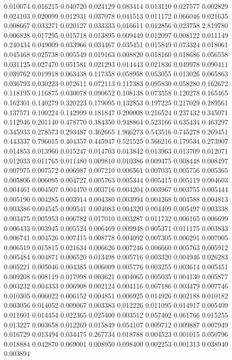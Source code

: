 0.010074
0.016215
0.040720
0.024129
0.083414
0.013110
0.027577
0.002829
0.024103
0.020099
0.012931
0.037078
0.041513
0.011172
0.066046
0.021635
0.008667
0.033271
0.020127
0.033333
0.016611
0.012856
0.023758
2.819780
0.006828
0.017295
0.015718
0.013895
0.009449
0.012097
0.008122
0.011149
0.240434
0.049009
0.033966
0.034467
0.035451
0.015849
0.073324
0.018061
0.045468
0.025738
0.005549
0.019163
0.008820
0.018160
0.018686
0.056558
0.031125
0.027470
0.051581
0.021293
0.014443
0.021836
0.049978
0.090411
0.039762
0.019918
0.063438
0.117358
0.058958
0.053055
0.013026
0.065863
0.036793
0.030223
0.072611
0.072113
0.117383
0.095830
0.058280
0.162672
0.118195
0.116875
0.030078
0.090652
0.108138
0.073558
0.120278
0.165465
0.162301
0.140279
0.320223
0.179095
0.132853
0.197225
0.217029
0.289561
0.137571
0.100224
0.142999
0.181847
0.290008
0.216524
0.237432
0.345071
0.112946
0.201140
0.478770
0.384350
0.948864
0.523166
0.635434
0.463297
0.345933
0.278573
0.293487
0.362665
1.966273
0.543516
0.745278
0.269451
0.443337
0.796015
0.404357
0.445947
0.521525
0.566216
0.179534
0.273907
0.014853
0.013960
0.015247
0.014703
0.013842
0.013963
0.013709
0.012071
0.012033
0.011765
0.011480
0.009810
0.010386
0.009475
0.008448
0.008497
0.007975
0.007572
0.006987
0.007210
0.006561
0.007035
0.005756
0.005365
0.005806
0.006095
0.004727
0.005763
0.005344
0.005415
0.005119
0.004603
0.004461
0.004507
0.004470
0.003716
0.004204
0.003967
0.003755
0.005444
0.005190
0.004285
0.003914
0.004380
0.003994
0.004268
0.004588
0.004813
0.003386
0.004545
0.009541
0.004083
0.004320
0.004409
0.005497
0.003338
0.003475
0.005953
0.006782
0.017010
0.003287
0.011732
0.006165
0.006699
0.006433
0.003945
0.005524
0.006469
0.009948
0.005371
0.011175
0.003833
0.006741
0.004526
0.007415
0.008778
0.004092
0.007305
0.006291
0.007005
0.006519
0.015815
0.021634
0.006626
0.007246
0.006660
0.005763
0.005912
0.005484
0.004871
0.006520
0.013498
0.005716
0.003320
0.004946
0.026283
0.005221
0.005046
0.004385
0.006009
0.005776
0.003255
0.003614
0.005451
0.009208
0.008119
0.017998
0.003621
0.004065
0.005035
0.004130
0.005877
0.003232
0.004333
0.006908
0.002124
0.004116
0.007186
0.003479
0.007746
0.010305
0.006022
0.006152
0.004851
0.006925
0.014926
0.002188
0.010182
0.003056
0.014052
0.009067
0.003383
0.012226
0.011095
0.014917
0.005409
0.011601
0.014454
0.022365
0.025400
0.003512
0.057402
0.061766
0.015255
0.013227
0.003658
0.012269
0.015849
0.054107
0.009712
0.009887
0.007949
0.016729
0.013494
0.034475
0.267734
0.018788
0.004523
0.001015
0.050796
0.018884
0.042870
0.069001
0.008950
0.098400
0.002253
0.001313
0.038940
0.003894
